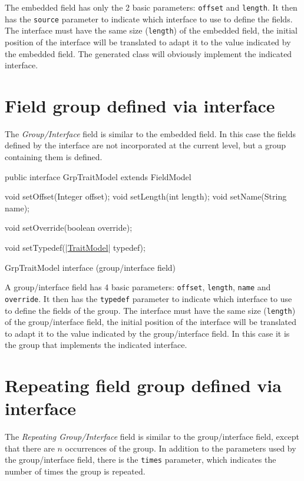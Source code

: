 \documentclass[a4paper,10pt]{report}
\newenvironment{elisting}[1][H]
  {\captionsetup{aboveskip=0pt}\begin{listing}[#1]}
  {\end{listing}%
}
\begin{document}
The embedded field has only the 2 basic parameters: \verb!offset! and 
\verb!length!. 
It then has the \verb!source! parameter to indicate which interface to use to 
define the fields. The interface must have the same size (\verb!length!) of the 
embedded field, the initial position of the interface will be translated to 
adapt it to the value indicated by the embedded field. 
The generated class will obviously implement the indicated interface.

\section{Field group defined via interface} 
The \textsl{Group/Interface} field is similar to the embedded field. 
In this case the fields defined by the interface are not incorporated at the 
current level, but a group containing them is defined.

\begin{elisting}[!htb]
\begin{javacode}
public interface GrpTraitModel extends FieldModel {
    void setOffset(Integer offset);
    void setLength(int length);
    void setName(String name);
    
    void setOverride(boolean override);
    
    void setTypedef(|\hyperref[lst:TraitModel]{TraitModel}| typedef);
}
\end{javacode}
\caption{GrpTraitModel interface (group/interface field)}
\label{lst:GrpTraitModel}
\end{elisting}

A group/interface field has 4 basic parameters: \verb!offset!, \verb!length!, 
\verb!name! and \verb!override!. It then has the \verb!typedef! parameter to 
indicate which interface to use to define the fields of the group. 
The interface must have the same size (\verb!length!) of the group/interface 
field, the initial position of the interface will be translated to adapt it to 
the value indicated by the group/interface field. 
In this case it is the group that implements the indicated interface.


\section{Repeating field group defined via interface}
The \textsl{Repeating Group/Interface} field is similar to the group/interface 
field, except that there are $n$ occurrences of the group. 
In addition to the parameters used by the group/interface field, there is the 
\verb!times! parameter, which indicates the number of times the group is 
repeated.
\end{document}
